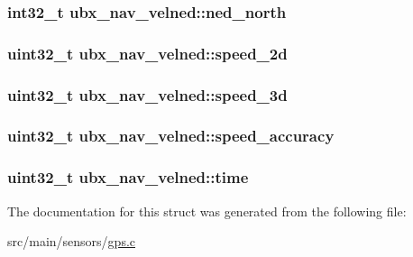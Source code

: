 \hypertarget{structubx__nav__velned_aa7f81d5dc27cbfbccee007a9c3585a34}{
\subsubsection[{ned\+\_\+north}]{\setlength{\rightskip}{0pt plus 5cm}int32\+\_\+t ubx\+\_\+nav\+\_\+velned\+::ned\+\_\+north}}\label{structubx__nav__velned_aa7f81d5dc27cbfbccee007a9c3585a34}
\hypertarget{structubx__nav__velned_a7894e2dd765ad10917f46b5d9d730e49}{
\subsubsection[{speed\+\_\+2d}]{\setlength{\rightskip}{0pt plus 5cm}uint32\+\_\+t ubx\+\_\+nav\+\_\+velned\+::speed\+\_\+2d}}\label{structubx__nav__velned_a7894e2dd765ad10917f46b5d9d730e49}
\hypertarget{structubx__nav__velned_ac82f3deea46466151bab94b968197120}{
\subsubsection[{speed\+\_\+3d}]{\setlength{\rightskip}{0pt plus 5cm}uint32\+\_\+t ubx\+\_\+nav\+\_\+velned\+::speed\+\_\+3d}}\label{structubx__nav__velned_ac82f3deea46466151bab94b968197120}
\hypertarget{structubx__nav__velned_ae89d7e1b350096180d962c50438c9e2e}{
\subsubsection[{speed\+\_\+accuracy}]{\setlength{\rightskip}{0pt plus 5cm}uint32\+\_\+t ubx\+\_\+nav\+\_\+velned\+::speed\+\_\+accuracy}}\label{structubx__nav__velned_ae89d7e1b350096180d962c50438c9e2e}
\hypertarget{structubx__nav__velned_a4d24ce209fc4dafbfb4c5c6743113038}{
\subsubsection[{time}]{\setlength{\rightskip}{0pt plus 5cm}uint32\+\_\+t ubx\+\_\+nav\+\_\+velned\+::time}}\label{structubx__nav__velned_a4d24ce209fc4dafbfb4c5c6743113038}


The documentation for this struct was generated from the following file\+:\begin{DoxyCompactItemize}
\item 
src/main/sensors/\hyperlink{gps_8c}{gps.\+c}\end{DoxyCompactItemize}
